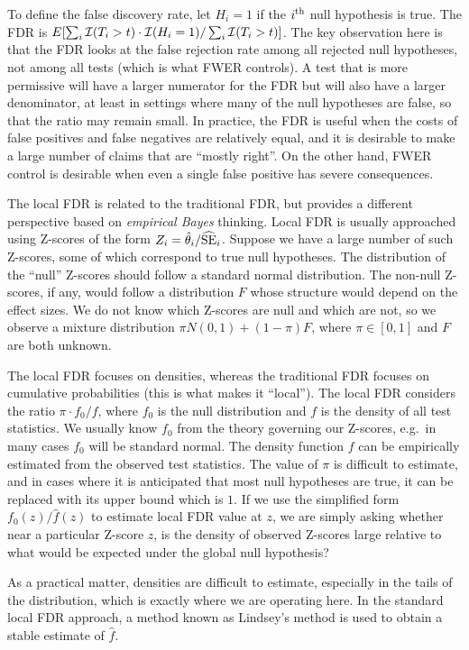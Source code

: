 To define the false discovery rate, let $H_i=1$ if the $i^{\rm th}$ null hypothesis is true. The FDR is $E[\sum_i {\cal I}(T_i > t)\cdot {\cal I}(H_i = 1) / \sum_i {\cal I}(T_i>t)]$. The key observation here is that the FDR looks at the false rejection rate among all rejected null hypotheses, not among all tests (which is what FWER controls). A test that is more permissive will have a larger numerator for the FDR but will also have a larger denominator, at least in settings where many of the null hypotheses are false, so that the ratio may remain small. In practice, the FDR is useful when the costs of false positives and false negatives are relatively equal, and it is desirable to make a large number of claims that are ``mostly right''. On the other hand, FWER control is desirable when even a single false positive has severe consequences.

The local FDR is related to the traditional FDR, but provides a different perspective based on {\em empirical Bayes} thinking. Local FDR is usually approached using Z-scores of the form $Z_i = \hat{\theta}_i / \widehat{\rm SE}_i$. Suppose we have a large number of such Z-scores, some of which correspond to true null hypotheses. The distribution of the ``null'' Z-scores should follow a standard normal distribution. The non-null Z-scores, if any, would follow a distribution $F$ whose structure would depend on the effect sizes. We do not know which Z-scores are null and which are not, so we observe a mixture distribution $\pi N(0, 1) + (1-\pi)F$, where $\pi \in [0, 1]$ and $F$ are both unknown.

The local FDR focuses on densities, whereas the traditional FDR focuses on cumulative probabilities (this is what makes it ``local''). The local FDR considers the ratio $\pi\cdot f_0 / f$, where $f_0$ is the null distribution and $f$ is the density of all test statistics. We usually know $f_0$ from the theory governing our Z-scores, e.g.\ in many cases $f_0$ will be standard normal. The density function $f$ can be empirically estimated from the observed test statistics. The value of $\pi$ is difficult to estimate, and in cases where it is anticipated that most null hypotheses are true, it can be replaced with its upper bound which is $1$. If we use the simplified form $f_0(z)/\hat{f}(z)$ to estimate local FDR value at $z$, we are simply asking whether near a particular Z-score $z$, is the density of observed Z-scores large relative to what would be expected under the global null hypothesis?

As a practical matter, densities are difficult to estimate, especially in the tails of the distribution, which is exactly where we are operating here. In the standard local FDR approach, a method known as Lindsey's method is used to obtain a stable estimate of $\hat{f}$.

